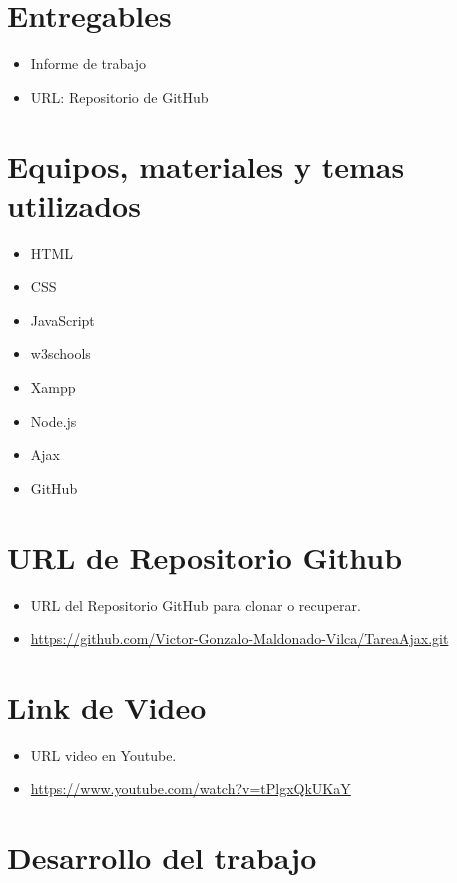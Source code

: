 \documentclass{article}
\begin{document}
    \section{Entregables}
    \begin{itemize}
        \item Informe de trabajo
        \item URL: Repositorio de GitHub
    \end{itemize}
    
		
	\section{Equipos, materiales y temas utilizados}
	\begin{itemize}
		\item HTML
		\item CSS
		\item JavaScript
		\item w3schools
		\item Xampp
		\item Node.js
		\item Ajax
        \item GitHub
	\end{itemize}
 
	
	\section{URL de Repositorio Github}
	\begin{itemize}
		\item URL del Repositorio GitHub para clonar o recuperar.
		\item \url{https://github.com/Victor-Gonzalo-Maldonado-Vilca/TareaAjax.git}
	\end{itemize}
	\section{Link de Video}
	\begin{itemize}
		\item URL video en Youtube.
		\item \url{https://www.youtube.com/watch?v=tPlgxQkUKaY}
	\end{itemize}



    \section{Desarrollo del trabajo}
\end{document}
